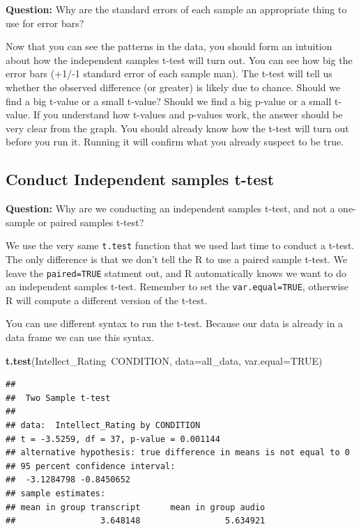 \documentclass[]{book}
\newenvironment{Shaded}{\begin{snugshade}}{\end{snugshade}}
\newcommand{\KeywordTok}[1]{\textcolor[rgb]{0.13,0.29,0.53}{\textbf{{#1}}}}
\newcommand{\DataTypeTok}[1]{\textcolor[rgb]{0.13,0.29,0.53}{{#1}}}
\newcommand{\OtherTok}[1]{\textcolor[rgb]{0.56,0.35,0.01}{{#1}}}
\newcommand{\NormalTok}[1]{{#1}}
\theoremstyle{definition}
\theoremstyle{definition}
\theoremstyle{definition}
\theoremstyle{remark}
\begin{document}
\textbf{Question:} Why are the standard errors of each sample an
appropriate thing to use for error bars?

Now that you can see the patterns in the data, you should form an
intuition about how the independent samples t-test will turn out. You
can see how big the error bars (+1/-1 standard error of each sample
man). The t-test will tell us whether the observed difference (or
greater) is likely due to chance. Should we find a big t-value or a
small t-value? Should we find a big p-value or a small t-value. If you
understand how t-values and p-values work, the answer should be very
clear from the graph. You should already know how the t-test will turn
out before you run it. Running it will confirm what you already suspect
to be true.

\subsection{Conduct Independent samples
t-test}\label{conduct-independent-samples-t-test}

\textbf{Question:} Why are we conducting an independent samples t-test,
and not a one-sample or paired samples t-test?

We use the very same \texttt{t.test} function that we used last time to
conduct a t-test. The only difference is that we don't tell the R to use
a paired sample t-test. We leave the \texttt{paired=TRUE} statment out,
and R automatically knows we want to do an independent samples t-test.
Remember to set the \texttt{var.equal=TRUE}, otherwise R will compute a
different version of the t-test.

You can use different syntax to run the t-test. Because our data is
already in a data frame we can use this syntax.

\begin{Shaded}
\begin{Highlighting}[]
\KeywordTok{t.test}\NormalTok{(Intellect_Rating~CONDITION, }\DataTypeTok{data=}\NormalTok{all_data, }\DataTypeTok{var.equal=}\OtherTok{TRUE}\NormalTok{)}
\end{Highlighting}
\end{Shaded}

\begin{verbatim}
## 
##  Two Sample t-test
## 
## data:  Intellect_Rating by CONDITION
## t = -3.5259, df = 37, p-value = 0.001144
## alternative hypothesis: true difference in means is not equal to 0
## 95 percent confidence interval:
##  -3.1284798 -0.8450652
## sample estimates:
## mean in group transcript      mean in group audio 
##                 3.648148                 5.634921
\end{verbatim}
\end{document}

